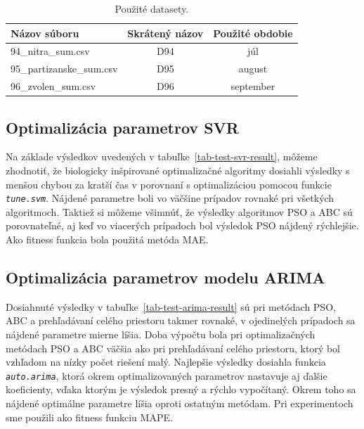 \documentclass[a4paper,slovak,12pt,appendix]{article}
\begin{document}
\begin{table}[ht]
  \centering
  \caption{Použité datasety.}
  \label{tab-datasets}
  \begin{tabular}{|l|c|c|}
    \hline
    \textbf{Názov súboru }  &   \textbf{Skrátený názov} 	  &   \textbf{Použité obdobie}  \\ \hline
		94\_nitra\_sum.csv        &    D94					&		 júl				\\ \hline
		95\_partizanske\_sum.csv  &    D95					&    august			\\ \hline
		96\_zvolen\_sum.csv		    &		 D96					&    september	\\ \hline
  \end{tabular}
\end{table}


\subsection{Optimalizácia parametrov SVR}
Na základe výsledkov uvedených v tabuľke~\ref{tab-test-svr-result}, môžeme
zhodnotiť, že biologicky inšpirované optimalizačné algoritmy dosiahli výsledky
s menšou chybou za kratší čas v porovnaní s optimalizáciou pomocou funkcie
\texttt{\textit{tune.svm}}. Nájdené parametre boli vo väčšine prípadov rovnaké
pri všetkých algoritmoch. Taktiež si môžeme všimnúť, že výsledky algoritmov PSO
a ABC sú porovnateľné, aj keď vo viacerých prípadoch bol výsledok PSO nájdený
rýchlejšie. Ako fitness funkcia bola použitá metóda MAE.


\subsection{Optimalizácia parametrov modelu ARIMA}
Dosiahnuté výsledky v tabuľke~\ref{tab-test-arima-result} sú pri metódach PSO,
ABC a prehľadávaní celého priestoru takmer rovnaké, v ojedinelých prípadoch sa
nájdené parametre mierne líšia. Doba výpočtu bola pri optimalizačných metódach
PSO a ABC väčšia ako pri prehľadávaní celého priestoru, ktorý bol vzhľadom na
nízky počet riešení malý. Najlepšie výsledky dosiahla funkcia \texttt{\textit{auto.arima}},
ktorá okrem optimalizovaných parametrov nastavuje aj ďalšie koeficienty, vďaka
ktorým je výsledok presný a rýchlo vypočítaný. Okrem toho sa nájdené optimálne
parametre líšia oproti ostatným metódam. Pri experimentoch sme použili ako
fitness funkciu MAPE.
\end{document}
